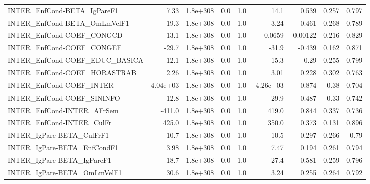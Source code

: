\begin{tabular}{lrrrrrrrr}
INTER\_EnfCond-BETA\_IgPareF1           &        7.33 &     1.8e+308 &      0.0 &      1.0 &       14.1 &       0.539 &        0.257 &         0.797 \\
INTER\_EnfCond-BETA\_OmLmVelF1          &        19.3 &     1.8e+308 &      0.0 &      1.0 &       3.24 &       0.461 &        0.268 &         0.789 \\
INTER\_EnfCond-COEF\_CONGCD             &       -13.1 &     1.8e+308 &      0.0 &      1.0 &    -0.0659 &    -0.00122 &        0.216 &         0.829 \\
INTER\_EnfCond-COEF\_CONGEF             &       -29.7 &     1.8e+308 &      0.0 &      1.0 &      -31.9 &      -0.439 &        0.162 &         0.871 \\
INTER\_EnfCond-COEF\_EDUC\_BASICA        &       -12.1 &     1.8e+308 &      0.0 &      1.0 &      -15.3 &       -0.29 &        0.255 &         0.799 \\
INTER\_EnfCond-COEF\_HORASTRAB          &        2.26 &     1.8e+308 &      0.0 &      1.0 &       3.01 &       0.228 &        0.302 &         0.763 \\
INTER\_EnfCond-COEF\_INTER              &    4.04e+03 &     1.8e+308 &      0.0 &      1.0 &  -4.26e+03 &      -0.874 &         0.38 &         0.704 \\
INTER\_EnfCond-COEF\_SININFO            &        12.8 &     1.8e+308 &      0.0 &      1.0 &       29.9 &       0.487 &         0.33 &         0.742 \\
INTER\_EnfCond-INTER\_AFrSem            &      -411.0 &     1.8e+308 &      0.0 &      1.0 &      419.0 &       0.844 &        0.337 &         0.736 \\
INTER\_EnfCond-INTER\_CulFr             &       425.0 &     1.8e+308 &      0.0 &      1.0 &      350.0 &       0.373 &        0.131 &         0.896 \\
INTER\_IgPare-BETA\_CulFrF1             &        10.7 &     1.8e+308 &      0.0 &      1.0 &       10.5 &       0.297 &        0.266 &          0.79 \\
INTER\_IgPare-BETA\_EnfCondF1           &        3.98 &     1.8e+308 &      0.0 &      1.0 &       7.47 &       0.194 &        0.261 &         0.794 \\
INTER\_IgPare-BETA\_IgPareF1            &        18.7 &     1.8e+308 &      0.0 &      1.0 &       27.4 &       0.581 &        0.259 &         0.796 \\
INTER\_IgPare-BETA\_OmLmVelF1           &        30.6 &     1.8e+308 &      0.0 &      1.0 &       3.24 &       0.255 &        0.264 &         0.792 \\

\end{tabular}
